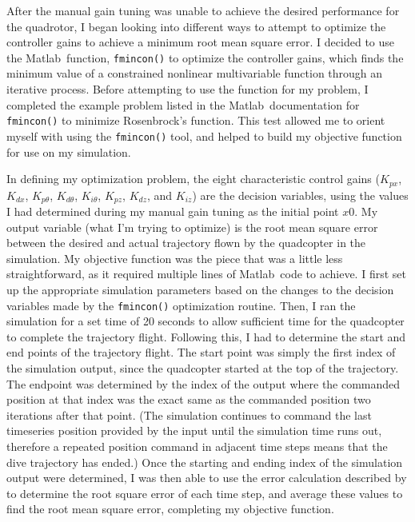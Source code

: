 \documentclass[onecolumn,10pt]{IEEEtran}
\newcommand{\MATLAB}{Matlab}
\begin{document}
After the manual gain tuning was unable to achieve the desired performance for the quadrotor, I began looking into different ways to attempt to optimize the controller gains to achieve a minimum root mean square error. I decided to use the \MATLAB\ function, \lstinline{fmincon()} to optimize the controller gains, which finds the minimum value of a constrained nonlinear multivariable function through an iterative process. Before attempting to use the function for my problem, I completed the example problem listed in the \MATLAB\ documentation for \lstinline{fmincon()} to minimize Rosenbrock's function. This test allowed me to orient myself with using the \lstinline{fmincon()} tool, and helped to build my objective function for use on my simulation. 

In defining my optimization problem, the eight characteristic control gains ($K_{px}$, $K_{dx}$, $K_{p\theta}$, $K_{d\theta}$, $K_{i\theta}$, $K_{pz}$, $K_{dz}$, and $K_{iz}$) are the decision variables, using the values I had determined during my manual gain tuning as the initial point $x0$. My output variable (what I'm trying to optimize) is the root mean square error between the desired and actual trajectory flown by the quadcopter in the simulation. My objective function was the piece that was a little less straightforward, as it required multiple lines of \MATLAB\ code to achieve. I first set up the appropriate simulation parameters based on the changes to the decision variables made by the \lstinline{fmincon()} optimization routine. Then, I ran the simulation for a set time of 20 seconds to allow sufficient time for the quadcopter to complete the trajectory flight. Following this, I had to determine the start and end points of the trajectory flight. The start point was simply the first index of the simulation output, since the quadcopter started at the top of the trajectory. The endpoint was determined by the index of the output where the commanded position at that index was the exact same as the commanded position two iterations after that point. (The simulation continues to command the last timeseries position provided by the input until the simulation time runs out, therefore a repeated position command in adjacent time steps means that the dive trajectory has ended.) Once the starting and ending index of the simulation output were determined, I was then able to use the error calculation described by  to determine the root square error of each time step, and average these values to find the root mean square error, completing my objective function.
\end{document}
